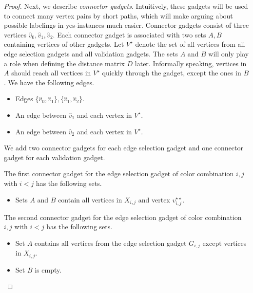 \documentclass[11pt,a4paper]{article}
\theoremstyle{remark}
\theoremstyle{definition}
\begin{document}
\begin{proof}
    Next, we describe \emph{connector gadgets}. Intuitively, these gadgets will be used to connect many vertex pairs by short paths, which will make arguing about possible labelings in yes-instances much easier. Connector gadgets consist of three vertices $\hat{v}_0,\hat{v}_1,\hat{v}_2$. 
    Each connector gadget is associated with two sets $A,B$ containing vertices of other gadgets. 
    Let $V^\star$ denote the set of all vertices from all edge selection gadgets and all validation gadgets.
    The sets $A$ and $B$ will only play a role when defining the distance matrix $D$ later. Informally speaking, vertices in $A$ should reach all vertices in $V^\star$ quickly through the gadget, except the ones in $B$.
    We have the following edges. 
    \begin{itemize}
        \item Edges $\{\hat{v}_0,\hat{v}_1\},\{\hat{v}_1,\hat{v}_2\}$.
        \item An edge between $\hat{v}_1$ and each vertex in $V^\star$.
        \item An edge between $\hat{v}_2$ and each vertex in $V^\star$.
    \end{itemize}
    We add two connector gadgets for each edge selection gadget and one connector gadget for each validation gadget.
    
    The first connector gadget for the edge selection gadget of color combination $i,j$ with $i<j$ has the following sets.
    \begin{itemize}
        \item Sets $A$ and $B$ contain all vertices in $X_{i,j}$ and vertex $v_{i,j}^{\star\star}$.
    \end{itemize}
    The second connector gadget for the edge selection gadget of color combination $i,j$ with $i<j$ has the following sets.
    \begin{itemize}
        \item Set $A$ contains all vertices from the edge selection gadget $G_{i,j}$ except vertices in $X_{i,j}$.
        \item Set $B$ is empty.
    \end{itemize}


\end{proof}
\end{document}
